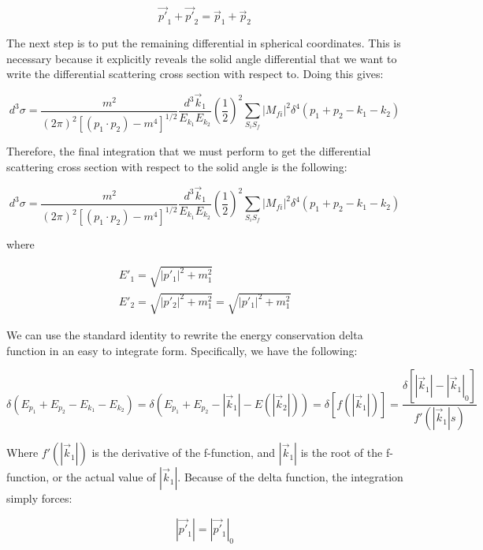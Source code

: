 \documentclass[a4]{article}
\begin{document}
    \begin{equation}
        \vec{p'}_1 + \vec{p'}_2 = \vec{p}_1 + \vec{p}_2
    \end{equation}

    The next step is to put the remaining differential in spherical coordinates. This is necessary because it explicitly reveals the solid angle differential that we want to write the differential scattering
    cross section with respect to. Doing this gives:

    \begin{equation}
        d^3 \sigma = \frac{m^2}{(2 \pi)^2 [(p_1 \cdot p_2) - m^4]^{1/2}} \frac{d^3 \vec{k}_1}{E_{k_1} E_{k_2}} (\frac{1}{2})^2 \sum_{S_i S_f} |M_{fi}|^2 \delta^4 (p_1 + p_2 - k_1 - k_2)
    \end{equation}

    Therefore, the final integration that we must perform to get the differential scattering cross section with respect to the solid angle is the following:

    \begin{equation}
        d^3 \sigma = \frac{m^2}{(2 \pi)^2 [(p_1 \cdot p_2) - m^4]^{1/2}} \frac{d^3 \vec{k}_1}{E_{k_1} E_{k_2}} (\frac{1}{2})^2 \sum_{S_i S_f} |M_{fi}|^2 \delta^4 (p_1 + p_2 - k_1 - k_2)
    \end{equation}

    where

    \begin{eqnarray}
        E'_1 = \sqrt{|p'_1|^2 + m_1^2} \\
        E'_2 = \sqrt{|p'_2|^2 + m_1^2} = \sqrt{|p'_1|^2 + m_1^2}
    \end{eqnarray}

    We can use the standard identity to rewrite the energy conservation delta function in an easy to integrate form. Specifically, we have the following: 

    \begin{equation}
        \delta (E_{p_1} + E_{p_2} - E_{k_1} - E_{k_2}) = \delta (E_{p_1} + E_{p_2} - |\vec{k}_1| - E (|\vec{k}_2|) ) = \delta [f (|\vec{k}_1|)] = \frac{\delta [|\vec{k}_1| - |\vec{k}_1|_0]}{f' (|\vec{k}_1|s)}
    \end{equation}

    Where $f'(|\vec{k}_1|)$ is the derivative of the f-function, and $|\vec{k}_1|$ is the root of the f-function, or the actual value of $|\vec{k}_1|$. Because of the delta function, the integration simply forces:

    \begin{equation}
        |\vec{p'}_1| = |\vec{p'}_1|_0
    \end{equation}
\end{document}
